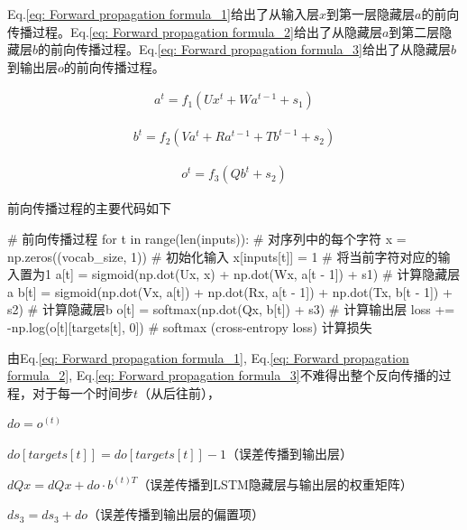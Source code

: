 \documentclass[letterpaper,12pt]{article}
\begin{document}
	Eq.\ref{eq: Forward propagation formula_1}给出了从输入层$x$到第一层隐藏层$a$的前向传播过程。Eq.\ref{eq: Forward propagation formula_2}给出了从隐藏层$a$到第二层隐藏层$b$的前向传播过程。Eq.\ref{eq: Forward propagation formula_3}给出了从隐藏层$b$到输出层$o$的前向传播过程。
	
	\begin{equation}
		\begin{aligned}
			a^t = f_1(Ux^t+Wa^{t-1}+s_1)
		\end{aligned}
		\label{eq: Forward propagation formula_1}
	\end{equation}
	
	\begin{equation}
		\begin{aligned}
			b^t = f_2(Va^t+Ra^{t-1}+Tb^{t-1}+s_2)
		\end{aligned}
		\label{eq: Forward propagation formula_2}
	\end{equation}
	
	\begin{equation}
		\begin{aligned}
			o^t = f_3(Qb^t+s_2)
		\end{aligned}
		\label{eq: Forward propagation formula_3}
	\end{equation}
	
	前向传播过程的主要代码如下
	
	\begin{python}
		# 前向传播过程
		for t in range(len(inputs)):  # 对序列中的每个字符
			x = np.zeros((vocab_size, 1))  # 初始化输入
			x[inputs[t]] = 1  # 将当前字符对应的输入置为1
			a[t] = sigmoid(np.dot(Ux, x) + np.dot(Wx, a[t - 1]) + s1)  # 计算隐藏层a
			b[t] = sigmoid(np.dot(Vx, a[t]) + np.dot(Rx, a[t - 1]) + np.dot(Tx, b[t - 1]) + s2)  # 计算隐藏层b
			o[t] = softmax(np.dot(Qx, b[t]) + s3)  # 计算输出层
			loss += -np.log(o[t][targets[t], 0])  # softmax (cross-entropy loss) 计算损失
	\end{python}
	
	由Eq.\ref{eq: Forward propagation formula_1}, Eq.\ref{eq: Forward propagation formula_2}, Eq.\ref{eq: Forward propagation formula_3}不难得出整个反向传播的过程，对于每一个时间步$t$（从后往前），
	
	$do = o^{(t)}$
	
	$do[targets[t]] = do[targets[t]] - 1$（误差传播到输出层）
	
	$dQx = dQx + do \cdot b^{(t)T}$（误差传播到LSTM隐藏层与输出层的权重矩阵）
	
	$ds_3 = ds_3 + do$（误差传播到输出层的偏置项）
	
\end{document}
